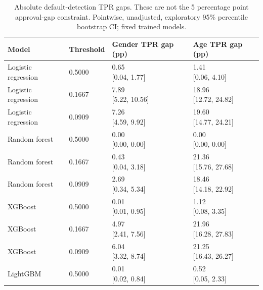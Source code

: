 \begingroup
\scriptsize
\setlength{\tabcolsep}{3pt}
\begin{longtable}{llll}
\caption{Absolute default-detection TPR gaps. These are not the 5 percentage point approval-gap constraint. Pointwise, unadjusted, exploratory 95\% percentile bootstrap CI; fixed trained models.}\label{tab:tpr-gaps-level4}\\
\toprule
Model & Threshold & Gender TPR gap (pp) & Age TPR gap (pp) \\
\midrule
Logistic regression & 0.5000 & \shortstack{{0.65} \\ {[0.04, 1.77]}} & \shortstack{{1.41} \\ {[0.06, 4.10]}} \\
Logistic regression & 0.1667 & \shortstack{{7.89} \\ {[5.22, 10.56]}} & \shortstack{{18.96} \\ {[12.72, 24.82]}} \\
Logistic regression & 0.0909 & \shortstack{{7.26} \\ {[4.59, 9.92]}} & \shortstack{{19.60} \\ {[14.77, 24.21]}} \\
Random forest & 0.5000 & \shortstack{{0.00} \\ {[0.00, 0.00]}} & \shortstack{{0.00} \\ {[0.00, 0.00]}} \\
Random forest & 0.1667 & \shortstack{{0.43} \\ {[0.04, 3.18]}} & \shortstack{{21.36} \\ {[15.76, 27.68]}} \\
Random forest & 0.0909 & \shortstack{{2.69} \\ {[0.34, 5.34]}} & \shortstack{{18.46} \\ {[14.18, 22.92]}} \\
XGBoost & 0.5000 & \shortstack{{0.01} \\ {[0.01, 0.95]}} & \shortstack{{1.12} \\ {[0.08, 3.35]}} \\
XGBoost & 0.1667 & \shortstack{{4.97} \\ {[2.41, 7.56]}} & \shortstack{{21.96} \\ {[16.28, 27.83]}} \\
XGBoost & 0.0909 & \shortstack{{6.04} \\ {[3.32, 8.74]}} & \shortstack{{21.25} \\ {[16.43, 26.27]}} \\
LightGBM & 0.5000 & \shortstack{{0.01} \\ {[0.02, 0.84]}} & \shortstack{{0.52} \\ {[0.05, 2.33]}} \\

\end{longtable}
